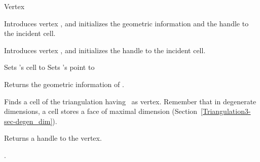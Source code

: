 \begin{ccRefClass}{Vertex}
\begin{ccAdvanced}
{Introduces vertex \ccVar, and initializes the geometric information and 
the handle to the incident cell.}

{Introduces vertex \ccVar, and initializes the handle to the incident cell.}


\ccOperations

{Sets \ccVar's cell to }
{Sets \ccVar's point to }

\end{ccAdvanced}

\ccAccessFunctions

{Returns the geometric information of \ccVar.}

{Finds a cell of the triangulation having \ccVar\ as
vertex. Remember that in degenerate dimensions, a cell stores a face
of maximal dimension (Section~\ref{Triangulation3-sec-degen_dim}).}

{Returns a handle to the vertex.}



\ccSeeAlso

.

\ccExample


\end{ccRefClass}


